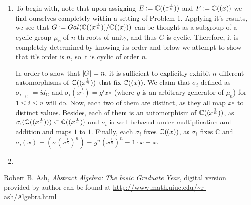 \documentclass[8pt]{article} %
\begin{document}
\begin{enumerate}[label=\bfseries Problem \arabic*.]
{\begin{enumerate}[label=(\arabic*).]
{				Thus $\E/\F$ is normal and separable, and hence Galois. 
				}
			\item{To begin with, note that upon assigning $E:=\mathbb{C}((x^{\frac{1}{n}}))$ and $F:=\mathbb{C}((x))$ we find ourselves completely within
				a setting of Problem 1. Applying it's results, we see that $G:=Gal(\mathbb{C}((x^{\frac{1}{n}}))/\mathbb{C}((x)))$ can be thought
				as a subgroup of a cyclic group $\mu_n$ of $n$-th roots of unity, and thus $G$ is cyclic. Therefore,
				it is completely determined by knowing its order and below we attempt to show that it's order is $n$,
				so it is cyclic of order $n$.

				In order to show that $\left|G\right|=n$, it is sufficient to explicitly exhibit $n$ different
				automorphisms of $\mathbb{C}((x^{\frac{1}{n}}))$ that fix $\mathbb{C}((x))$. We claim that $\sigma_i$ defined as $\sigma_i\mid_\mathbb{C}
				=id_\mathbb{C}$
				and $\sigma_i(x^{\frac{1}{n}})=g^ix^{\frac{1}{n}}$ (where $g$ is an arbitrary generator of $\mu_n$)
				for $1\leq i\leq n$ will do. Now, each two of them are distinct, as they all map $x^{\frac{1}{n}}$
				to distinct values. Besides, each of them is an automorphism of $\mathbb{C}((x^{\frac{1}{n}}))$, as $\sigma_i(\mathbb{C}((x^{\frac{1}{n}})))\subset\mathbb{C}((x^{\frac{1}{n}}))$
				and $\sigma_i$ is well-behaved under multiplication and addition and maps $1$ to $1$. Finally,
				each $\sigma_i$ fixes $\mathbb{C}((x))$, as $\sigma_i$ fixes $\mathbb{C}$ and $\sigma_i(x)=(\sigma(x^{\frac{1}{n}})
				^n)=g^n(x^{\frac{1}{n}})^n=1\cdot x=x$.
				}
			\item{
				}
		\end{enumerate}
		}
\end{enumerate}
\begin{thebibliography}{9}
	 Robert B. Ash, {\em Abstract Algebra: The basic Graduate Year}, digital version provided by author can be found at
		\url{http://www.math.uiuc.edu/~r-ash/Algebra.html}
\end{thebibliography}
\end{document}
